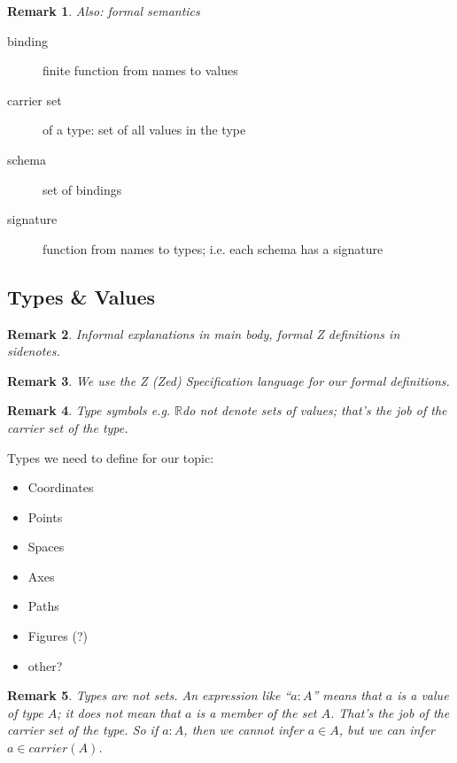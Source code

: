 \documentclass[reqno,12pt]{tufte-handout}
\numberwithin{equation}{subsection}
\numberwithin{equation}{subsection}
\newtheorem{remark}{Remark}
\newcommand\R{\(\mathds{R}\)}
\begin{document}
\begin{remark}
  Also: formal semantics
\end{remark}

\begin{description}
\item [binding] finite function from names to values
\item [carrier set] of a type: set of all values in the type
\item [schema] set of bindings
\item [signature] function from names to types; i.e. each schema has a signature
\end{description}

\subsection{Types \& Values}
\label{sect:types}

\begin{remark}
  Informal explanations in main body, formal Z definitions in
  sidenotes.
\end{remark}

\begin{remark}
  We use the Z (Zed) Specification language for our formal definitions.
\end{remark}

\begin{remark}
  Type symbols e.g. \R do not denote sets of values; that's the job of the carrier set of the type.
\end{remark}

Types we need to define for our topic:

\begin{itemize}
\item Coordinates
\item Points
\item Spaces
\item Axes
\item Paths
\item Figures (?)
\item other?
\end{itemize}

\begin{remark}
  Types are not sets. An expression like ``\(a:A\)'' means that \(a\)
  is a value of type \(A\); it does \textit{not} mean that \(a\) is a
  \textit{member} of the set \(A\).  That's the job of the
  \textit{carrier set} of the type.  So if \(a:A\), then we cannot
  infer \(a\in A\), but we can infer \(a\in carrier(A)\).
\end{remark}
\end{document}
